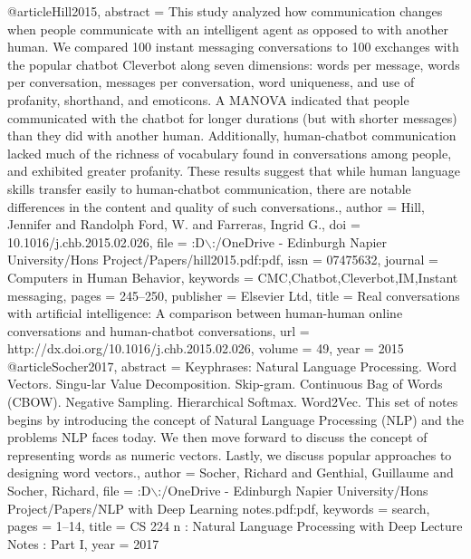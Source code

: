 @article{Hill2015,
      abstract = {This study analyzed how communication changes when people communicate with an intelligent agent as opposed to with another human. We compared 100 instant messaging conversations to 100 exchanges with the popular chatbot Cleverbot along seven dimensions: words per message, words per conversation, messages per conversation, word uniqueness, and use of profanity, shorthand, and emoticons. A MANOVA indicated that people communicated with the chatbot for longer durations (but with shorter messages) than they did with another human. Additionally, human-chatbot communication lacked much of the richness of vocabulary found in conversations among people, and exhibited greater profanity. These results suggest that while human language skills transfer easily to human-chatbot communication, there are notable differences in the content and quality of such conversations.},
      author = {Hill, Jennifer and {Randolph Ford}, W. and Farreras, Ingrid G.},
      doi = {10.1016/j.chb.2015.02.026},
      file = {:D$\backslash$:/OneDrive - Edinburgh Napier University/Hons Project/Papers/hill2015.pdf:pdf},
      issn = {07475632},
      journal = {Computers in Human Behavior},
      keywords = {CMC,Chatbot,Cleverbot,IM,Instant messaging},
      pages = {245--250},
      publisher = {Elsevier Ltd},
      title = {{Real conversations with artificial intelligence: A comparison between human-human online conversations and human-chatbot conversations}},
      url = {http://dx.doi.org/10.1016/j.chb.2015.02.026},
      volume = {49},
      year = {2015}
}
@article{Socher2017,
      abstract = {Keyphrases: Natural Language Processing. Word Vectors. Singu-lar Value Decomposition. Skip-gram. Continuous Bag of Words (CBOW). Negative Sampling. Hierarchical Softmax. Word2Vec. This set of notes begins by introducing the concept of Natural Language Processing (NLP) and the problems NLP faces today. We then move forward to discuss the concept of representing words as numeric vectors. Lastly, we discuss popular approaches to designing word vectors.},
      author = {Socher, Richard and Genthial, Guillaume and Socher, Richard},
      file = {:D$\backslash$:/OneDrive - Edinburgh Napier University/Hons Project/Papers/NLP with Deep Learning notes.pdf:pdf},
      keywords = {search},
      pages = {1--14},
      title = {{CS 224 n : Natural Language Processing with Deep Lecture Notes : Part I}},
      year = {2017}
}

